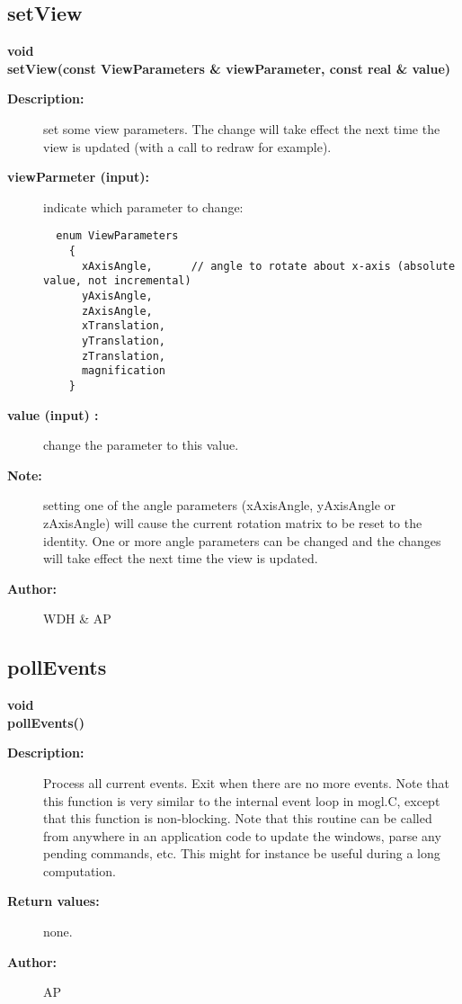 \subsection{setView}
 
\begin{flushleft} \textbf{%
void  \\ 
\settowidth{\GLGraphicsInterfaceIncludeArgIndent}{setView(}%
setView(const ViewParameters \& viewParameter, const real \& value)
}\end{flushleft}

\begin{description}
\item[{\bf Description:}]  set some view parameters. The change will take effect
   the next time the view is updated (with a call to redraw for example).

\item[{\bf viewParmeter (input):}]  indicate which parameter to change:
   \begin{verbatim}
  enum ViewParameters
    {
      xAxisAngle,      // angle to rotate about x-axis (absolute value, not incremental)
      yAxisAngle,
      zAxisAngle,
      xTranslation,
      yTranslation,
      zTranslation,
      magnification
    }
   \end{verbatim}
\item[{\bf value (input) :}]  change the parameter to this value.
\item[{\bf Note:}]  setting one of the angle parameters (xAxisAngle, yAxisAngle or zAxisAngle)
   will cause the current rotation matrix to be reset to the identity. One or more
   angle parameters can be changed and the changes will take effect the next time the
   view is updated.
\item[{\bf Author:}]  WDH \& AP

\end{description}
\subsection{pollEvents}
 
\begin{flushleft} \textbf{%
void  \\ 
\settowidth{\GLGraphicsInterfaceIncludeArgIndent}{pollEvents(}%
pollEvents()
}\end{flushleft}
\begin{description}
\item[{\bf Description:}] 
 Process all current events. Exit when there are no more events. Note that this function
 is very similar to the internal event loop in mogl.C, except that this function is non-blocking.
 Note that this routine can be called from anywhere in an application code to update the
 windows, parse any pending commands, etc. This might for instance be useful during 
 a long computation.

\item[{\bf Return values:}]  none.
\item[{\bf Author:}]  AP
\end{description}

